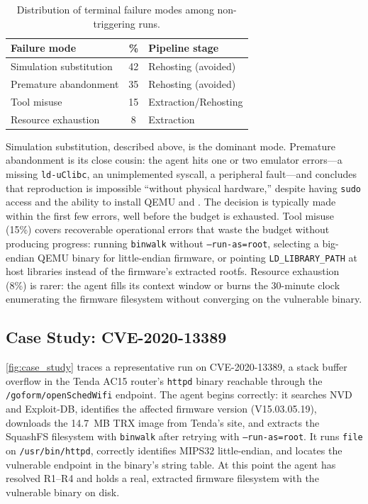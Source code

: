 \begin{table}[t]
    \centering
    \caption{Distribution of terminal failure modes among non-triggering runs.}
    \label{tab:failures}
    \begin{tabular}{lcl}
        \toprule
        \textbf{Failure mode} & \textbf{\%} & \textbf{Pipeline stage} \\
        \midrule
        Simulation substitution  & 42 & Rehosting (avoided) \\
        Premature abandonment    & 35 & Rehosting (avoided) \\
        Tool misuse              & 15 & Extraction/Rehosting \\
        Resource exhaustion      & 8  & Extraction \\
        \bottomrule
    \end{tabular}
\end{table}

Simulation substitution, described above, is the dominant mode. Premature abandonment is its close cousin: the agent hits one or two emulator errors---a missing \texttt{ld-uClibc}, an unimplemented syscall, a peripheral fault---and concludes that reproduction is impossible ``without physical hardware,'' despite having \texttt{sudo} access and the ability to install QEMU and \firmae. The decision is typically made within the first few errors, well before the budget is exhausted. Tool misuse (15\%) covers recoverable operational errors that waste the budget without producing progress: running \texttt{binwalk} without \texttt{--run-as=root}, selecting a big-endian QEMU binary for little-endian firmware, or pointing \texttt{LD\_LIBRARY\_PATH} at host libraries instead of the firmware's extracted rootfs. Resource exhaustion (8\%) is rarer: the agent fills its context window or burns the 30-minute clock enumerating the firmware filesystem without converging on the vulnerable binary.

\subsection{Case Study: CVE-2020-13389}

\cref{fig:case_study} traces a representative run on CVE-2020-13389, a stack buffer overflow in the Tenda AC15 router's \texttt{httpd} binary reachable through the \texttt{/goform/openSchedWifi} endpoint. The agent begins correctly: it searches NVD and Exploit-DB, identifies the affected firmware version (V15.03.05.19), downloads the 14.7~MB TRX image from Tenda's site, and extracts the SquashFS filesystem with \texttt{binwalk} after retrying with \texttt{--run-as=root}. It runs \texttt{file} on \texttt{/usr/bin/httpd}, correctly identifies MIPS32 little-endian, and locates the vulnerable endpoint in the binary's string table. At this point the agent has resolved R1--R4 and holds a real, extracted firmware filesystem with the vulnerable binary on disk.

